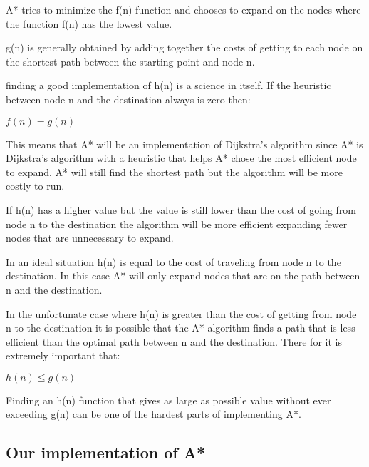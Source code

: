\documentclass[12pt, a4paper]{article}
\begin{document}
A* tries to minimize the f(n) function and chooses to expand on the nodes where the function f(n) has the lowest value. 

g(n) is generally obtained by adding together the costs of getting to each node on the shortest path between the starting point and node n. 

finding a good implementation of h(n) is a science in itself. If the heuristic between node n and the destination always is zero then:

\begin{center}
$f(n) = g(n)$
\end{center}

This means that A* will be an implementation of Dijkstra’s algorithm since A* is Dijkstra’s algorithm with a heuristic that helps A* chose the most efficient node to expand. A* will still find the shortest path but the algorithm will be more costly to run.

If h(n) has a higher value but the value is still lower than the cost of going from node n to the destination the algorithm will be more efficient expanding fewer nodes that are unnecessary to expand. 

In an ideal situation h(n) is equal to the cost of traveling from node n to the destination. In this case A* will only expand nodes that are on the path between n and the destination. 

In the unfortunate case where h(n) is greater than the cost of getting from node n to the destination it is possible that the A* algorithm finds a path that is less efficient than the optimal path between n and the destination. There for it is extremely important that:

\begin{center}
$h(n) \leq g(n)$
\end{center}

Finding an h(n) function that gives as large as possible value without ever exceeding g(n) can be one of the hardest parts of implementing A*.



\subsection{Our implementation of A*}

\end{document}
